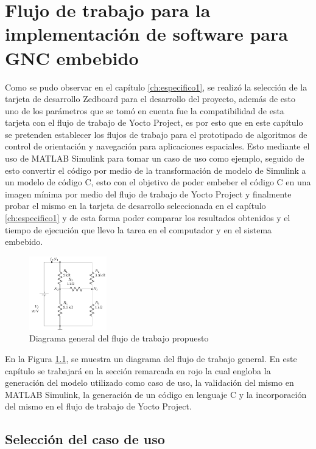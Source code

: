 \chapter{Flujo de trabajo para la implementación de software para GNC embebido}
\label{ch:especifico2}

Como se pudo observar en el capítulo \ref{ch:especifico1}, se realizó la selección de la tarjeta de desarrollo Zedboard para el desarrollo del proyecto, además de esto uno de los parámetros que se tomó en cuenta fue la compatibilidad de esta tarjeta con el flujo de trabajo de Yocto Project, es por esto que en este capítulo se pretenden establecer los flujos de trabajo para el prototipado de algoritmos de control de orientación y navegación para aplicaciones espaciales. Esto mediante el uso de MATLAB Simulink para tomar un caso de uso como ejemplo, seguido de esto convertir el código por medio de la transformación de modelo de Simulink a un modelo de código C, esto con el objetivo de poder embeber el código C en una imagen mínima por medio del flujo de trabajo de Yocto Project y finalmente probar el mismo en la tarjeta de desarrollo seleccionada en el capítulo \ref{ch:especifico1} y de esta forma poder comparar los resultados obtenidos y el tiempo de ejecución que llevo la tarea en el computador y en el sistema embebido.


\begin{figure}[h!]
    \centering
    \includegraphics[width=0.3\textwidth]{fig/figtemplate.pdf}
    \caption{Diagrama general del flujo de trabajo propuesto}
    \label{fig:diagrama_flujo_trabajo}
\end{figure}


En la Figura \ref{fig:diagrama_flujo_trabajo}, se muestra un diagrama del flujo de trabajo general. En este capítulo se trabajará en la sección remarcada en rojo la cual engloba la generación del modelo utilizado como caso de uso, la validación del mismo en MATLAB Simulink, la generación de un código en lenguaje C y la incorporación del mismo en el flujo de trabajo de Yocto Project.


\section{Selección del caso de uso}

